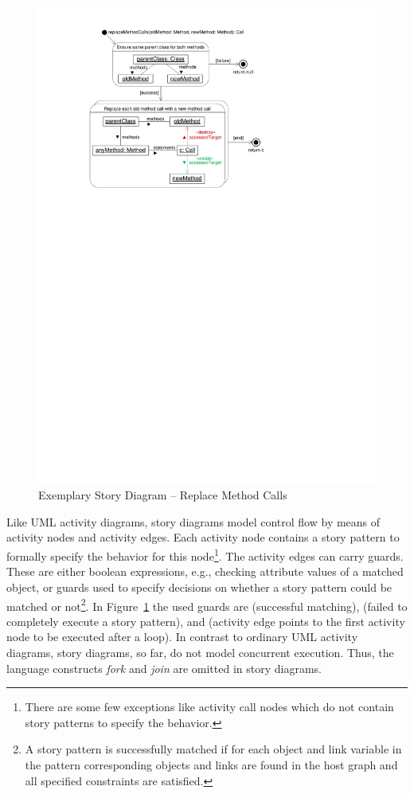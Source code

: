 \begin{figure}[htb]
  \centering
  \includegraphics[scale=1.0]{figures/SimpleStoryDiagramExample}
  \caption{Exemplary Story Diagram -- Replace Method Calls}
  \label{fig:simpleStoryDiagram}
\end{figure}

Like UML activity diagrams, story diagrams model control flow by means of activity nodes and activity edges.
Each activity node contains a story pattern to formally specify the behavior for this node\footnote{There are
some few exceptions like activity call nodes which do not contain story patterns to specify the behavior.}.
The activity edges can carry guards.
These are either boolean expressions, e.g., checking attribute values of a matched object,
or guards used to specify decisions on whether a story pattern could be
matched or not\footnote{A story pattern is successfully matched if for each object and link variable in the pattern corresponding objects and links are found in the host graph and all specified constraints are satisfied.}.
In Figure~\ref{fig:simpleStoryDiagram} the used guards are  (successful matching),
 (failed to completely execute a story pattern),
and  (activity edge points to the first activity node to be executed after a loop).
In contrast to ordinary UML activity diagrams, story diagrams, so far, do not model concurrent execution.
Thus, the language constructs \emph{fork} and \emph{join} are omitted in story diagrams.

